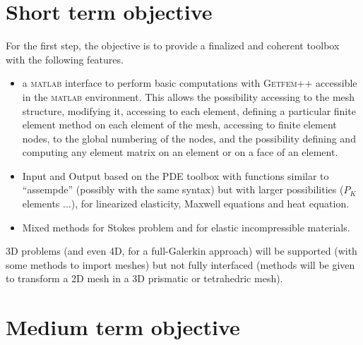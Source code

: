 \documentclass[11pt,a4paper]{article}
\begin{document}
\section{Short term objective}

For the first step, the objective is to provide a finalized and coherent
toolbox with the following features.
\begin{itemize}
\item  a \textsc{matlab} interface to perform basic computations with 
\textsc{Getfem++}  accessible in the \textsc{matlab} environment. This
allows the possibility accessing to the mesh structure, modifying it,
accessing to each element, defining a particular finite element method on
each element of the mesh, accessing to finite element nodes, to the global
numbering of the nodes, and the possibility defining and computing any
element matrix on an element or on a face of an element.

\item  Input and Output based on the PDE toolbox with functions similar to
``assempde'' (possibly with the same syntax) but with larger possibilities ($%
P_{K}$ elements ...), for linearized elasticity, Maxwell equations and heat
equation.

\item  Mixed methods for Stokes problem and for elastic incompressible
materials.
\end{itemize}

3D problems (and even 4D, for a full-Galerkin approach) will be supported
(with some methods to import meshes) but not fully interfaced (methods will
be given to transform a 2D mesh in a 3D prismatic or tetrahedric mesh).

\section{Medium term objective}
\end{document}
